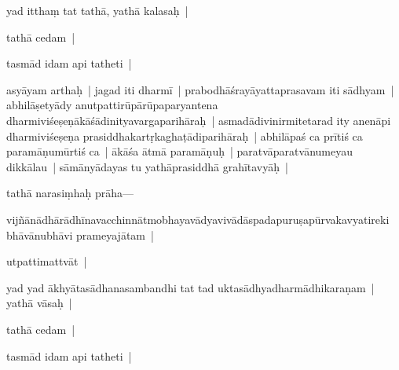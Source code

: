 \documentclass[article,a4paper]{memoir}
\newcommand{\add}[1]{($^{+}$#1)}
\begin{document}
	  \pstart yad itthaṃ tat tathā\-, yathā\- kalasaḥ |
	\pend
      

	  \pstart tathā\- cedam |
	\pend
      

	  \pstart tasmā\-d idam api tatheti |\label{sarit__ratnakīrtinibandhāvali__103091}
	\pend
      

	  \pstart asyā\-yam arthaḥ | jagad iti dharmī\- | prabodhā\-śrayā\-yattaprasavam iti sā\-dhyam | \label{rnā__102859}abhilā\-ṣe\label{rnā__102897}tyā\-dy anutpattirū\-pā\-rū\-paparyantena dharmiviśeṣeṇā\-kā\-śā\-dinityavargaparihā\-raḥ | asmadā\-divinirmitetarad ity anenā\-pi dharmiviśeṣeṇa prasiddhakartṛkaghaṭā\-diparihā\-raḥ | \label{rnā__103110}abhilā\-paś\label{rnā__103149} ca prī\-tiś ca paramā\-ṇumū\-rtiś ca | ā\-kā\-śa ā\-tmā\- paramā\-ṇuḥ | paratvā\-paratvā\-numeyau dikkā\-lau | sā\-mā\-nyā\-dayas tu yathā\-prasiddhā\- grahī\-tavyā\-ḥ |
	\pend
      

	  \pstart {}\label{sarit__ratnakīrtinibandhāvali__103807}tathā\- narasiṃhaḥ prā\-ha—
	\pend
      

	  \pstart vijñā\-nā\-dhā\-rā\-dhī\-na\edtext{janmājanmā}{\Afootnote{jan\add{mā\-}janmā\- \cite{}}}vacchinnā\-tmobhayavā\-dyavivā\-dā\-spadapuruṣapū\-rvakavyatireki bhā\-vā\-nubhā\-vi prameyajā\-tam |
	\pend
      

	  \pstart utpattimattvā\-t |
	\pend
      

	  \pstart yad yad ā\-khyā\-tasā\-dhanasambandhi tat tad uktasā\-dhyadharmā\-dhikaraṇam | yathā\- vā\-saḥ |
	\pend
      

	  \pstart tathā\- cedam |
	\pend
      

	  \pstart tasmā\-d idam api tatheti |\label{sarit__ratnakīrtinibandhāvali__104267}
	\pend
      
\end{document}
